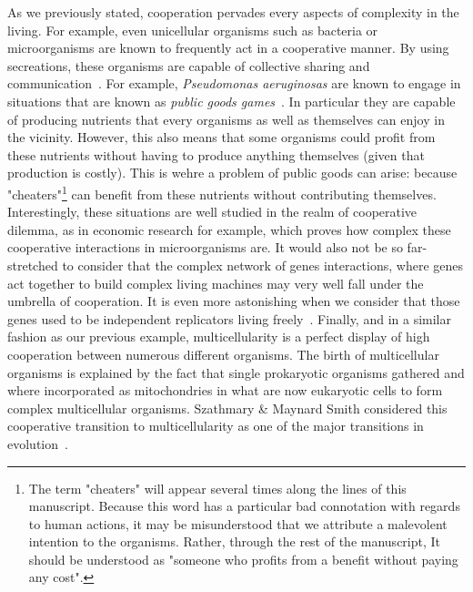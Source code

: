     As we previously stated, cooperation pervades every aspects of complexity in the living. For example, even unicellular organisms such as bacteria or microorganisms are known to frequently act in a cooperative manner. By using secreations, these organisms are capable of collective sharing and communication~\parencite{Elena2003, Keller2006, West2006}. For example, \emph{Pseudomonas aeruginosas} are known to engage in situations that are known as \emph{public goods games}~\parencite{Popat2012, Harrison2013}. In particular they are capable of producing nutrients that every organisms as well as themselves can enjoy in the vicinity. However, this also means that some organisms could profit from these nutrients without having to produce anything themselves (given that production is costly). This is wehre a problem of public goods can arise: because "cheaters"\footnote{The term "cheaters" will appear several times along the lines of this manuscript. Because this word has a particular bad connotation with regards to human actions, it may be misunderstood that we attribute a malevolent intention to the organisms. Rather, through the rest of the manuscript, It should be understood as "someone who profits from a benefit without paying any cost".} can benefit from these nutrients without contributing themselves. Interestingly, these situations are well studied in the realm of cooperative dilemma, as in economic research for example, which proves how complex these cooperative interactions in microorganisms are. It would also not be so far-stretched to consider that the complex network of genes interactions, where genes act together to build complex living machines may very well fall under the umbrella of cooperation. It is even more astonishing when we consider that those genes used to be independent replicators living freely~\parencite{Dawkins1976, Szathmary1995}. Finally, and in a similar fashion as our previous example, multicellularity is a perfect display of high cooperation between numerous different organisms. The birth of multicellular organisms is explained by the fact that single prokaryotic organisms gathered and where incorporated as mitochondries in what are now eukaryotic cells to form complex multicellular organisms. Szathmary \& Maynard Smith considered this cooperative transition to multicellularity as one of the major transitions in evolution~\parencite{Szathmary1995}.

